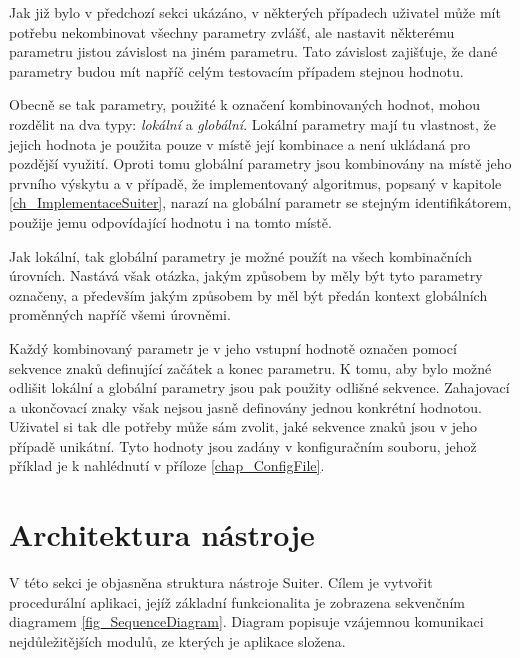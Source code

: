 Jak již bylo v předchozí sekci ukázáno, v některých případech uživatel může mít potřebu nekombinovat všechny parametry zvlášť, ale nastavit některému parametru jistou závislost na jiném parametru. Tato závislost zajišťuje, že dané parametry budou mít napříč celým testovacím případem stejnou hodnotu. 

Obecně se tak parametry, použité k označení kombinovaných hodnot, mohou rozdělit na dva typy: \textit{lokální} a \textit{globální}. Lokální parametry mají tu vlastnost, že jejich hodnota je použita pouze v místě její kombinace a není ukládaná pro pozdější využití. Oproti tomu globální parametry jsou kombinovány na místě jeho prvního výskytu a v případě, že implementovaný algoritmus, popsaný v kapitole \ref{ch_ImplementaceSuiter}, narazí na globální parametr se stejným identifikátorem, použije jemu odpovídající hodnotu i na tomto místě.  


Jak lokální, tak globální parametry je možné použít na všech kombinačních úrovních. Nastává však otázka, jakým způsobem by měly být tyto parametry označeny, a především jakým způsobem by měl být předán kontext globálních proměnných napříč všemi úrovněmi. 

Každý kombinovaný parametr je v jeho vstupní hodnotě označen pomocí sekvence znaků definující začátek a konec parametru. K tomu, aby bylo možné odlišit lokální a globální parametry jsou pak použity odlišné sekvence. Zahajovací a ukončovací znaky však nejsou jasně definovány jednou konkrétní hodnotou. Uživatel si tak dle potřeby může sám zvolit, jaké sekvence znaků jsou v jeho případě unikátní. Tyto hodnoty jsou zadány v konfiguračním souboru, jehož příklad je k nahlédnutí v příloze \ref{chap_ConfigFile}. 





\section{Architektura nástroje}
\label{sec_ArchitekturaNastroje}

V této sekci je objasněna struktura nástroje Suiter. Cílem je vytvořit procedurální aplikaci, jejíž základní funkcionalita je zobrazena sekvenčním diagramem \ref{fig_SequenceDiagram}. Diagram popisuje vzájemnou komunikaci nejdůležitějších modulů, ze kterých je aplikace složena.

